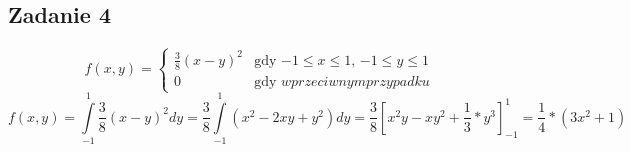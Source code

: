 \subsection{Zadanie 4}

$$
f(x,y)
 = \left\{ \begin{array}{ll}
\frac{3}{8}(x-y)^2& \textrm{gdy $-1 \leq x \leq 1$, $-1 \leq y \leq 1$}\\
0 & \textrm{gdy $w przeciwnym przypadku$}
\end{array} \right.
$$
$$
f(x,y)
 = \int\limits_{-1}^{1} \frac{3}{8}(x-y)^2 dy =  \frac{3}{8}  \int\limits_{-1}^{1} (x^2 - 2xy + y^2) dy =  \frac{3}{8}[x^2y - xy^2 + \frac{1}{3} * y^3 ] _{-1}^{1} = \frac{1}{4} * (3x^2 + 1)
$$
